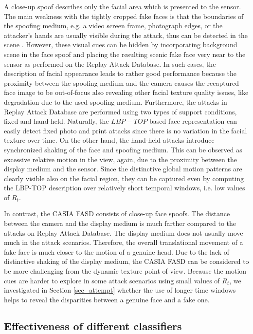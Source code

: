 A close-up spoof describes only the facial area which is presented to the sensor. The main weakness with the tightly cropped fake faces is that the boundaries of the spoofing medium, e.g. a video screen frame, photograph edges, or the attacker's hands are usually visible during the attack, thus can be detected in the scene \citep{JukkaLBP2012}. However, these visual cues can be hidden by incorporating background scene in the face spoof and placing the resulting scenic fake face very near to the sensor as performed on the Replay Attack Database. In such cases, the description of facial appearance leads to rather good performance because the proximity between the spoofing medium and the camera causes the recaptured face image to be out-of-focus also revealing other facial texture quality issues, like degradation due to the used spoofing medium. Furthermore, the attacks in Replay Attack Database are performed using two types of support conditions, fixed and hand-held. Naturally, the $LBP-TOP$ based face representation can easily detect fixed photo and print attacks since there is no variation in the facial texture over time. On the other hand, the hand-held attacks introduce synchronized shaking of the face and spoofing medium. This can be observed as excessive relative motion in the view, again, due to the proximity between the display medium and the sensor. Since the distinctive global motion patterns are clearly visible also on the facial region, they can be captured even by computing the LBP-TOP description over relatively short temporal windows, i.e. low values of $R_t$.

In contrast, the CASIA FASD consists of close-up face spoofs. The distance between the camera and the display medium is much farther compared to the attacks on Replay Attack Database. The display medium does not usually move much in the attack scenarios. Therefore, the overall translational movement of a fake face is much closer to the motion of a genuine head. Due to the lack of distinctive shaking of the display medium, the CASIA FASD can be considered to be more challenging from the dynamic texture point of view. Because the motion cues are harder to explore in some attack scenarios using small values of $R_t$, we investigated in Section \ref{sec_attempt} whether the use of longer time windows helps to reveal the disparities between a genuine face and a fake one.


\subsection{Effectiveness of different classifiers}
\label{sec_different_classifiers}

